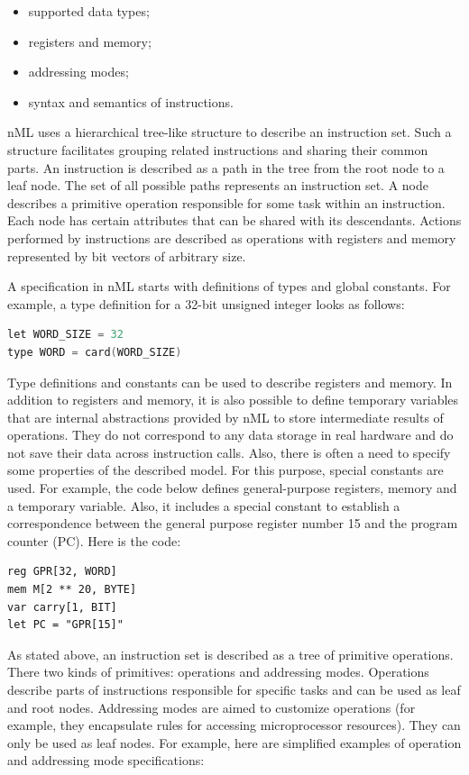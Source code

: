 \documentclass[oneside,final,14pt]{extreport}
\begin{document}
\begin{itemize}
\item supported data types;
\item registers and memory;
\item addressing modes;
\item syntax and semantics of instructions.
\end{itemize}

nML uses a hierarchical tree-like structure to describe an instruction set.
Such a structure facilitates grouping related instructions and sharing their
common parts. An instruction is described as a path in the tree from the root
node to a leaf node. The set of all possible paths represents an instruction
set. A node describes a primitive operation responsible for some task within
an instruction. Each node has certain attributes that can be shared with its
descendants. Actions performed by instructions are described as operations
with registers and memory represented by bit vectors of arbitrary size.

A specification in nML starts with definitions of types and global constants.
For example, a type definition for a 32-bit unsigned integer looks as follows:

\begin{lstlisting}[language=C]
let WORD_SIZE = 32
type WORD = card(WORD_SIZE)
\end{lstlisting}

Type definitions and constants can be used to describe registers and memory.
In addition to registers and memory, it is also possible to define temporary
variables that are internal abstractions provided by nML to store intermediate
results of operations. They do not correspond to any data storage in real
hardware and do not save their data across instruction calls. Also, there is
often a need to specify some properties of the described model. For this
purpose, special constants are used. For example, the code below defines
general-purpose registers, memory and a temporary variable. Also, it includes
a special constant to establish a correspondence between the general purpose
register number 15 and the program counter (PC). Here is the code:

\begin{lstlisting}
reg GPR[32, WORD]
mem M[2 ** 20, BYTE]
var carry[1, BIT]
let PC = "GPR[15]"
\end{lstlisting}

As stated above, an instruction set is described as a tree of primitive
operations. There two kinds of primitives: operations and addressing modes.
Operations describe parts of instructions responsible for specific tasks and
can be used as leaf and root nodes. Addressing modes are aimed to customize
operations (for example, they encapsulate rules for accessing microprocessor
resources). They can only be used as leaf nodes. For example, here are
simplified examples of operation and addressing mode specifications:
\end{document}
